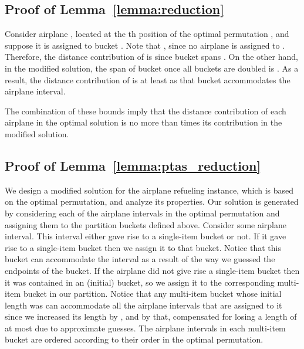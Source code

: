 \documentclass[11pt]{article}
\theoremstyle{plain}
\theoremstyle{definition}
\begin{document}
\subsection{Proof of Lemma~\ref{lemma:reduction}}

Consider airplane , located at the th position of the optimal permutation , and suppose it is assigned to bucket . Note that , since no airplane is assigned to . Therefore, the distance contribution of  is  since bucket  spans . On the other hand, in the modified solution, the span of bucket  once all buckets are doubled is . As a result, the distance contribution of  is at least  as that bucket accommodates the airplane interval.

The combination of these bounds imply that the distance contribution of each airplane in the optimal solution is no more than  times its contribution in the modified solution.

\subsection{Proof of Lemma~\ref{lemma:ptas_reduction}}

We design a modified solution for the airplane refueling instance, which is based on the optimal permutation, and analyze its properties. Our solution is generated by considering each of the airplane intervals in the optimal permutation and assigning them to the partition buckets defined above. Consider some airplane interval. This interval either gave rise to a single-item bucket or not. If it gave rise to a single-item bucket then we assign it to that bucket. Notice that this bucket can accommodate the interval as a result of the way we guessed the endpoints of the bucket. If the airplane did not give rise a single-item bucket then it was contained in an (initial) bucket, so we assign it to the corresponding multi-item bucket in our partition. Notice that any multi-item bucket  whose initial length was  can accommodate all the airplane intervals that are assigned to it since we increased its length by , and by that, compensated for losing a length of at most  due to approximate guesses. The airplane intervals in each multi-item bucket are ordered according to their order in the optimal permutation.
\end{document}

